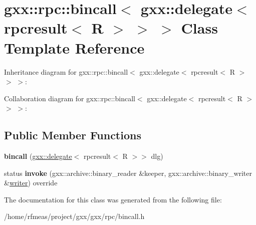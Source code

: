 \hypertarget{classgxx_1_1rpc_1_1bincall_3_01gxx_1_1delegate_3_01rpcresult_3_01R_01_4_01_4_01_4}{}\section{gxx\+:\+:rpc\+:\+:bincall$<$ gxx\+:\+:delegate$<$ rpcresult$<$ R $>$ $>$ $>$ Class Template Reference}
\label{classgxx_1_1rpc_1_1bincall_3_01gxx_1_1delegate_3_01rpcresult_3_01R_01_4_01_4_01_4}


Inheritance diagram for gxx\+:\+:rpc\+:\+:bincall$<$ gxx\+:\+:delegate$<$ rpcresult$<$ R $>$ $>$ $>$\+:


Collaboration diagram for gxx\+:\+:rpc\+:\+:bincall$<$ gxx\+:\+:delegate$<$ rpcresult$<$ R $>$ $>$ $>$\+:
\subsection*{Public Member Functions}
\begin{DoxyCompactItemize}
\item 
{\bfseries bincall} (\hyperlink{classgxx_1_1delegate}{gxx\+::delegate}$<$ rpcresult$<$ R $>$$>$ dlg)\hypertarget{classgxx_1_1rpc_1_1bincall_3_01gxx_1_1delegate_3_01rpcresult_3_01R_01_4_01_4_01_4_a6d37f5aa305b2b1ff57baa06379cc2cd}{}\label{classgxx_1_1rpc_1_1bincall_3_01gxx_1_1delegate_3_01rpcresult_3_01R_01_4_01_4_01_4_a6d37f5aa305b2b1ff57baa06379cc2cd}

\item 
status {\bfseries invoke} (gxx\+::archive\+::binary\+\_\+reader \&keeper, gxx\+::archive\+::binary\+\_\+writer \&\hyperlink{classgxx_1_1writer}{writer}) override\hypertarget{classgxx_1_1rpc_1_1bincall_3_01gxx_1_1delegate_3_01rpcresult_3_01R_01_4_01_4_01_4_ae978cb5bffe2eb887007ea3b27c5efda}{}\label{classgxx_1_1rpc_1_1bincall_3_01gxx_1_1delegate_3_01rpcresult_3_01R_01_4_01_4_01_4_ae978cb5bffe2eb887007ea3b27c5efda}

\end{DoxyCompactItemize}


The documentation for this class was generated from the following file\+:\begin{DoxyCompactItemize}
\item 
/home/rfmeas/project/gxx/gxx/rpc/bincall.\+h\end{DoxyCompactItemize}
